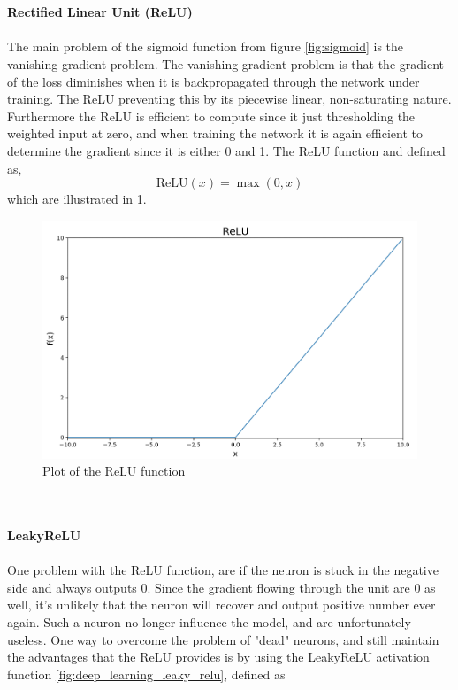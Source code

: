 \documentclass[11pt]{article}
\begin{document}
\\ \\
\textbf{Rectified Linear Unit (ReLU)}
\\ \\
The main problem of the sigmoid function from figure \ref{fig:sigmoid} is the vanishing gradient problem. The vanishing gradient problem is that the gradient of the loss diminishes when it is backpropagated through the network under training. The ReLU preventing this by its piecewise linear, non-saturating nature. Furthermore the ReLU is efficient to compute since it just thresholding the weighted input at zero, and when training the network it is again efficient to determine the gradient since it is either 0 and 1. The ReLU function and defined as,
\begin{equation}
    \text{ReLU}(x) = \max(0, x)
\end{equation}
which are illustrated in \ref{fig:relu}.
\begin{figure}[!h]
    \centering
    \includegraphics[scale = 0.33]{figurer/deep_learning/relu.png}
    \caption{Plot of the ReLU function}
    \label{fig:relu}
\end{figure}
\\ \\
\textbf{LeakyReLU}
\\ \\
One problem with the ReLU function, are if the neuron is stuck in the negative side and always outputs 0. Since the gradient flowing through the unit are 0 as well, it's unlikely that the neuron will recover and output positive number ever again. Such a neuron no longer influence the model, and are unfortunately useless. One way to overcome the problem of "dead" neurons, and still maintain the advantages that the ReLU provides is by using the LeakyReLU activation function \ref{fig:deep_learning_leaky_relu}, defined as
\end{document}
